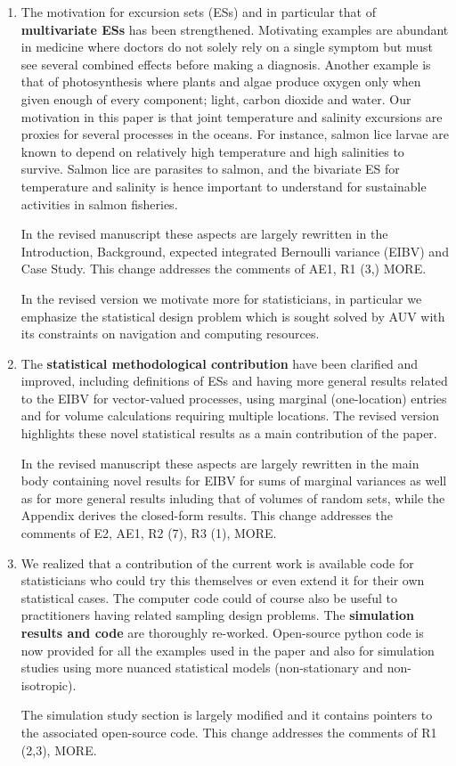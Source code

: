 \documentclass[a4paper]{article}
\begin{document}
\begin{enumerate}
\item The motivation for excursion sets (ESs) and in particular that of {\bf{multivariate ESs}} has been strengthened. Motivating examples are abundant in medicine where doctors do not solely rely on a single symptom but must see several combined effects before making a diagnosis. Another example is that of photosynthesis where plants and algae produce oxygen only when given enough of every component; light, carbon dioxide and water. Our motivation in this paper is that joint temperature and salinity excursions are proxies for several processes in the oceans. For instance, salmon lice larvae are known to depend on relatively high temperature and high salinities to survive. Salmon lice are parasites to salmon, and the bivariate ES for temperature and salinity is hence important to understand for sustainable activities in salmon fisheries.


In the revised manuscript these aspects are largely rewritten in the Introduction, Background, expected integrated Bernoulli variance (EIBV) and Case Study. This change addresses the comments of AE1, R1 (3,) MORE.

In the revised version we motivate more for statisticians, in particular we emphasize the statistical design problem which is sought solved by AUV with its constraints on navigation and computing resources.

\item The {\bf{statistical methodological contribution}} have been clarified and improved, including definitions of ESs and having more general results related to the EIBV for vector-valued processes, using marginal (one-location) entries and for volume calculations requiring multiple locations. The revised version highlights these novel statistical results as a main contribution of the paper. 

In the revised manuscript these aspects are largely rewritten in the main body containing novel results for EIBV for sums of marginal variances as well as for more general results inluding that of volumes of random sets, while the Appendix derives the closed-form results. This change addresses the comments of E2, AE1, R2 (7), R3 (1), MORE.

\item We realized that a contribution of the current work is available code for statisticians who could try this themselves or even extend it for their own statistical cases. The computer code could of course also be useful to practitioners having related sampling design problems. The {\bf{simulation results and code}} are thoroughly re-worked. Open-source python code is now provided for all the examples used in the paper and also for simulation studies using more nuanced statistical models (non-stationary and non-isotropic). 
 
The simulation study section is largely modified and it contains pointers to the associated open-source code. This change addresses the comments of R1 (2,3),  MORE.

\end{enumerate}
\par \vspace{1em}
\end{document}
